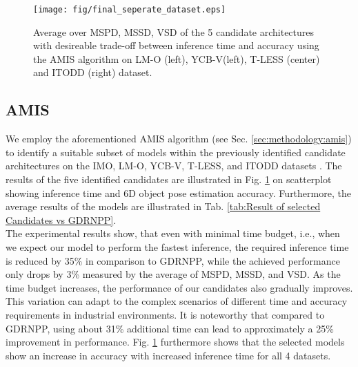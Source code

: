 \begin{figure}[b]   
    \texttt{[image: fig/final\_seperate\_dataset.eps]}
    \caption[Average of MSPD, MSSD, VSD]{Average over MSPD, MSSD, VSD of the 5 candidate architectures with desireable trade-off between inference time and accuracy using the AMIS algorithm on LM-O (left), YCB-V(left), T-LESS (center) and ITODD (right) dataset.}
    \label{fig:Average of MSPD, MSSD, VSD_reference}
\end{figure}

\subsection{AMIS}
\label{sec:results:amis}


We employ the aforementioned AMIS algorithm (see Sec. \ref{sec:methodology:amis}) to identify a suitable subset of models within the previously identified candidate architectures on the IMO, LM-O, YCB-V, T-LESS, and ITODD datasets \cite{xiang2017posecnn, drost2017introducing, hodan2017t,}.
The results of the five identified candidates are illustrated in Fig. \ref{fig:Average of MSPD, MSSD, VSD_reference} on scatterplot showing inference time and 6D object pose estimation accuracy.
Furthermore, the average results of the models are illustrated in Tab. \ref{tab:Result of selected Candidates vs GDRNPP}.\\
The experimental results show, that even with minimal time budget, i.e., when we expect our model to perform the fastest inference, the required inference time is reduced by 35\% in comparison to GDRNPP, while the achieved performance only drops by 3\% measured by the average of MSPD, MSSD, and VSD.
As the time budget increases, the performance of our candidates also gradually improves. This variation can adapt to the complex scenarios of different time and accuracy requirements in industrial environments. It is noteworthy that compared to GDRNPP, using about 31\% additional time can lead to approximately a 25\% improvement in performance.
Fig. \ref{fig:Average of MSPD, MSSD, VSD_reference} furthermore shows that the selected models show an increase in accuracy with increased inference time for all 4 datasets.


